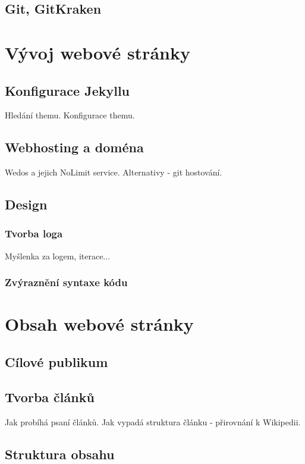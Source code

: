 \documentclass[a4paper, 12pt]{article}
\begin{document}
  \subsection{Git, GitKraken}

  \section{Vývoj webové stránky}

  \subsection{Konfigurace Jekyllu}
  Hledání themu.
  Konfigurace themu.

  \subsection{Webhosting a doména}
  Wedos a jejich NoLimit service.
  Alternativy - git hostování.

  \subsection{Design}

  \subsubsection{Tvorba loga}
  Myšlenka za logem, iterace...

  \subsubsection{Zvýraznění syntaxe kódu}

  \section{Obsah webové stránky}

  \subsection{Cílové publikum}

  \subsection{Tvorba článků}
  Jak probíhá psaní článků.
  Jak vypadá struktura článku - přirovnání k Wikipedii.

  \subsection{Struktura obsahu}
\end{document}
